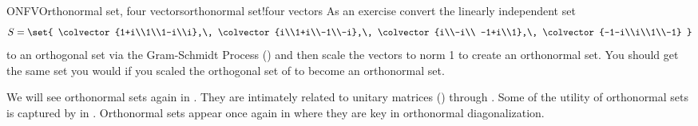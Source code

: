 \begin{example}{ONFV}{Orthonormal set, four vectors}{orthonormal set!four vectors}
As an exercise convert the linearly independent set
%
\begin{equation*}
S=\set{
\colvector{1+i\\1\\1-i\\i},\,
\colvector{i\\1+i\\-1\\-i},\,
\colvector{i\\-i\\ -1+i\\1},\,
\colvector{-1-i\\i\\1\\-1}
}
\end{equation*}
%
to an orthogonal set via the Gram-Schmidt Process () and then scale the vectors to norm 1 to create an orthonormal set.  You should get the same set you would if you scaled the orthogonal set of  to become an orthonormal set.
\end{example}
%
We will see orthonormal sets again in .   They are intimately related to unitary matrices () through .  Some of the utility of orthonormal sets is captured by  in .   Orthonormal sets appear once again in  where they are key in orthonormal diagonalization.\par
%
%
%

